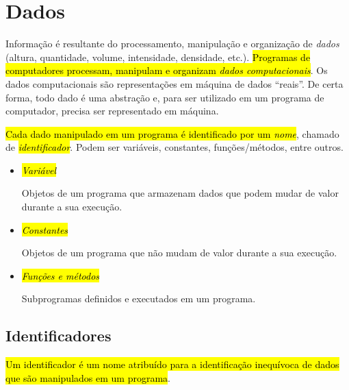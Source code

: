 \section{Dados}\label{cap_lingua_sec_dados}

Informação é resultante do processamento, manipulação e organização de \emph{dados} (altura, quantidade, volume, intensidade, densidade, etc.). \hl{Programas de computadores processam, manipulam e organizam \emph{dados computacionais}}. Os dados computacionais são representações em máquina de dados ``reais''. De certa forma, todo dado é uma abstração e, para ser utilizado em um programa de computador, precisa ser representado em máquina.

\hl{Cada dado manipulado em um programa é identificado por um \emph{nome}}, chamado de \hl{\emph{identificador}}. Podem ser variáveis, constantes, funções/métodos, entre outros.
\begin{itemize}
\item \hl{\emph{Variável}}

  Objetos de um programa que armazenam dados que podem mudar de valor durante a sua execução.

\item \hl{\emph{Constantes}}

  Objetos de um programa que não mudam de valor durante a sua execução.

\item \hl{\emph{Funções e métodos}}

  Subprogramas definidos e executados em um programa.
\end{itemize}

\subsection{Identificadores}

\hl{Um identificador é um nome atribuído para a identificação inequívoca de dados que são manipulados em um programa}.

